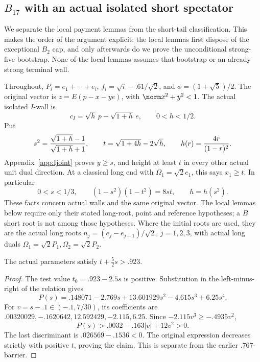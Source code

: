 \subsection{\(B_{17}\) with an actual isolated short spectator}
\label{app:B17I18}
We separate the local payment lemmas from the short-tail classification.
This makes the order of the argument explicit: the local lemmas first
dispose of the exceptional \(B_2\) cap, and only afterwards do we prove
the unconditional strong-five bootstrap. None of the local lemmas assumes
that bootstrap or an already strong terminal wall.

Throughout, \(P_i=e_1+\cdots+e_i\),
\(f_i=\sqrt i-.61/\sqrt2\), and \(\phi=(1+\sqrt5)/2\).
The original vector is \(z=E(p-x-ye)\), with
\(\norm x^2+y^2<1\). The actual isolated \(I\)-wall is
\[
 c_I=\sqrt h\,p-\sqrt{1+h}\,e,\qquad 0<h<1/2.
\]
Put
\[
 s^2={\sqrt{1+h}-1\over\sqrt{1+h}+1},\qquad
 t=\sqrt{1+4h}-2\sqrt h,\qquad h(r)={4r\over(1-r)^2}.
\]
Appendix~\ref{app:Ijoint} proves \(y\ge s\), and height at least
\(t\) in every other actual unit dual direction. At a classical long
end with \(\Omega_1=\sqrt2e_1\), this says \(x_1\ge t\).
In particular
\[
 0<s<1/3,\qquad (1-s^2)(1-t^2)=8st,\qquad h=h(s^2).
\]
These facts concern actual walls and the same original vector.
The local lemmas below require only their stated long-root, point and
reference hypotheses; a \(B\) short root is not among those hypotheses.
Where the initial roots are used, they are the actual long roots
\(n_j=(e_j-e_{j+1})/\sqrt2\), \(j=1,2,3\), with actual
long duals \(\Omega_1=\sqrt2P_1,\Omega_2=\sqrt2P_2\).

\begin{lemma}
\label{lem:I923-real-barrier}
The actual parameters satisfy \(t+\tfrac52s>.923\).
\end{lemma}
\begin{proof}
The test value \(t_0=.923-2.5s\) is positive. Substitution in the
left-minus-right of the relation gives
\[
 P(s)=.148071-2.769s+13.601929s^2-4.615s^3+6.25s^4.
\]
For \(v=s-.1\in(-.1,7/30)\), its coefficients are
\(.00320029,-.1620642,12.592429,-2.115,6.25\).
Since \(-2.115v^3\ge-.4935v^2\),
\[
 P(s)>.0032-.163|v|+12v^2>0.
\]
The last discriminant is \(.026569-.1536<0\). The original
expression decreases strictly with positive \(t\), proving the claim.
This is separate from the earlier \(.767\)-barrier.
\end{proof}

